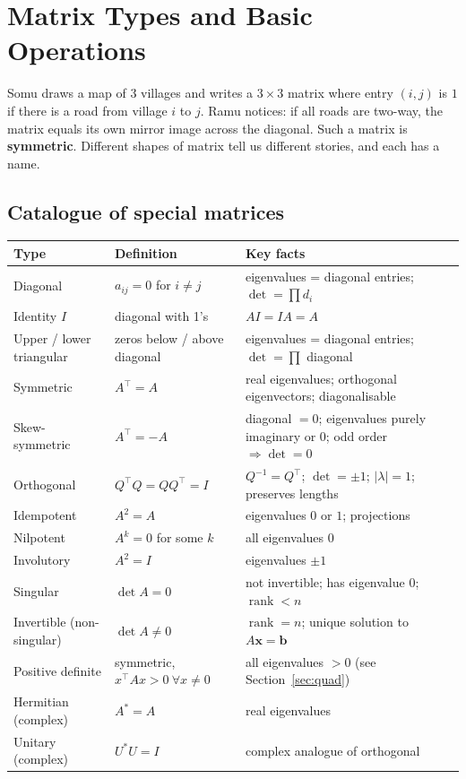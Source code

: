 \documentclass[11pt,a4paper]{article}
\newcommand{\T}{^{\top}}
\newcommand{\rank}{\operatorname{rank}}
\begin{document}
\section{Matrix Types and Basic Operations}

\begin{story}
Somu draws a map of 3 villages and writes a $3\times3$ matrix where entry $(i,j)$ is $1$ if there is a road from village $i$ to $j$. Ramu notices: if all roads are two-way, the matrix equals its own mirror image across the diagonal. Such a matrix is \textbf{symmetric}. Different shapes of matrix tell us different stories, and each has a name.
\end{story}

\subsection{Catalogue of special matrices}
\begin{center}
\small
\begin{tabularx}{\textwidth}{>{\raggedright\arraybackslash}p{3.0cm} >{\raggedright\arraybackslash}p{4.4cm} >{\raggedright\arraybackslash}X}
\toprule
\textbf{Type} & \textbf{Definition} & \textbf{Key facts}\\
\midrule
Diagonal & $a_{ij}=0$ for $i\ne j$ & eigenvalues = diagonal entries; $\det=\prod d_i$\\
Identity $I$ & diagonal with 1's & $AI=IA=A$\\
Upper / lower triangular & zeros below / above diagonal & eigenvalues = diagonal entries; $\det=\prod$ diagonal\\
Symmetric & $A\T=A$ & real eigenvalues; orthogonal eigenvectors; diagonalisable\\
Skew-symmetric & $A\T=-A$ & diagonal $=0$; eigenvalues purely imaginary or $0$; odd order $\Rightarrow\det=0$\\
Orthogonal & $Q\T Q=QQ\T=I$ & $Q^{-1}=Q\T$; $\det=\pm1$; $|\lambda|=1$; preserves lengths\\
Idempotent & $A^2=A$ & eigenvalues $0$ or $1$; projections\\
Nilpotent & $A^k=0$ for some $k$ & all eigenvalues $0$\\
Involutory & $A^2=I$ & eigenvalues $\pm1$\\
Singular & $\det A=0$ & not invertible; has eigenvalue $0$; $\rank<n$\\
Invertible (non-singular) & $\det A\ne0$ & $\rank=n$; unique solution to $A\mathbf x=\mathbf b$\\
Positive definite & symmetric, $x\T Ax>0\ \forall x\ne0$ & all eigenvalues $>0$ (see Section~\ref{sec:quad})\\
Hermitian (complex) & $A^*=A$ & real eigenvalues\\
Unitary (complex) & $U^*U=I$ & complex analogue of orthogonal\\
\bottomrule
\end{tabularx}
\end{center}
\end{document}
